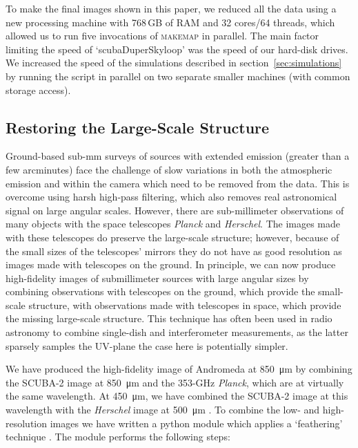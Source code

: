 \documentclass[a4paper,fleqn,usenatbib, twocolumn]{aastex63}
\begin{document}
To make the final images shown in this paper, we reduced all the data using a new processing machine with 768\,GB of RAM and 32 
cores/64 threads, which allowed us to run five invocations of \textsc{makemap} in parallel. The main factor limiting the speed of `scubaDuperSkyloop' was the speed of our hard-disk drives. We increased the speed of the simulations described
in section~\ref{sec:simulations} by running the script in parallel on two 
separate smaller machines (with common storage access).

\subsection{Restoring the Large-Scale Structure}
\label{sec:feather}

Ground-based sub-mm surveys of sources with extended emission (greater than a few arcminutes) face the challenge of slow variations in both the atmospheric emission and within the camera which
need to be removed from the data. This is overcome using harsh high-pass filtering,
which also removes real astronomical signal on large angular scales. However, there are sub-millimeter observations of many objects with the space telescopes 
\textit{Planck} and \textit{Herschel}. The images made with these telescopes
do preserve the large-scale structure; however, because of the small sizes of the
telescopes' mirrors they do not have as good resolution as images made with
telescopes on the ground. In principle, we can now produce high-fidelity
images of submillimeter sources with large angular sizes by combining
observations with telescopes on the ground, which provide the small-scale structure, with observations made with telescopes in space, which provide the missing large-scale structure. This technique has often been used in radio astronomy to combine
single-dish and interferometer measurements, as the latter sparsely samples the UV-plane the case here is potentially simpler. 
 
 We have produced the high-fidelity image of Andromeda at \SI{850}{\micro\meter} by combining
 the SCUBA-2 image at  \SI{850}{\micro\meter} and the 353-GHz {\it Planck}, which are
 at virtually the same wavelength. At \SI{450}{\micro\meter}, we have
 combined the SCUBA-2 image at this wavelength with the {\it Herschel} image
 at  \SI{500}{\micro\meter} \citep{smith2012}. To combine the low- and high-resolution images we have written a python module which applies a `feathering' technique \citep{Bajaja1979}. The module performs the following steps:
 
\end{document}
